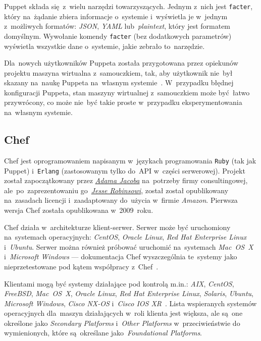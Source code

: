 \documentclass[thesis]{subfiles}
\begin{document}
Puppet składa się~z~wielu narzędzi towarzyszących. Jednym z~nich jest \texttt{facter}, który na~żądanie zbiera informacje o~systemie i~wyświetla je w~jednym z~możliwych formatów: \emph{JSON}, \emph{YAML} lub~\emph{plaintext}, który jest formatem domyślnym. Wywołanie komendy \texttt{facter} (bez dodatkowych parametrów) wyświetla wszystkie dane o~systemie, jakie zebrało to~narzędzie.

Dla~nowych użytkowników Puppeta została przygotowana przez opiekunów projektu maszyna wirtualna z~samouczkiem, tak, aby użytkownik nie~był skazany na~naukę Puppeta na~własnym systemie~\cite{puppet-vm-tutorial}. W~przypadku błędnej konfiguracji Puppeta, stan maszyny wirtualnej z~samouczkiem może być~łatwo przywrócony, co może nie~być takie proste w~przypadku eksperymentowania na~własnym systemie.


\subsection{Chef}

Chef jest oprogramowaniem napisanym w~językach programowania \texttt{Ruby} (tak jak Puppet) i~\texttt{Erlang} (zastosowanym tylko do~API w~części serwerowej). Projekt został zapoczątkowany przez \href{https://blog.chef.io/author/adam/}{\emph{Adama Jacoba}} na~potrzeby firmy consultingowej, ale~po~zaprezentowaniu go~\href{https://en.wikipedia.org/wiki/Jesse_Robbins}{\emph{Jesse Robinsowi}}, został został opublikowany na~zasadach licencji  i~zaadaptowany do~użycia w~firmie \emph{Amazon}. Pierwsza wersja Chef została opublikowana w~2009~roku.

Chef działa w~architekturze klient-serwer. Serwer może być uruchomiony na~systemach operacyjnych: \emph{CentOS}, \emph{Oracle Linux}, \emph{Red Hat Enterprise Linux} i~\emph{Ubuntu}. Serwer można również próbować uruchomić na~systemach \emph{Mac~OS~X} i~\emph{Microsoft Windows} --- dokumentacja Chef wyszczególnia te~systemy jako nieprzetestowane pod kątem współpracy z~Chef~\cite{chef-supported-platforms}.

Klientami mogą być systemy działające pod kontrolą m.in.: \emph{AIX}, \emph{CentOS}, \emph{FreeBSD}, \emph{Mac~OS~X}, \emph{Oracle Linux}, \emph{Red Hat Enterprise Linux}, \emph{Solaris}, \emph{Ubuntu}, \emph{Microsoft Windows}, \emph{Cisco NX-OS} i~\emph{Cisco IOS XR}~\cite{chef-supported-platforms}. Lista wspieranych systemów operacyjnych dla~maszyn działających w~roli klienta jest większa, ale są~one określone jako \emph{Secondary Platforms} i~\emph{Other Platforms} w~przeciwieństwie do wymienionych, które są~określane jako~\emph{Foundational Platforms}.
\end{document}

